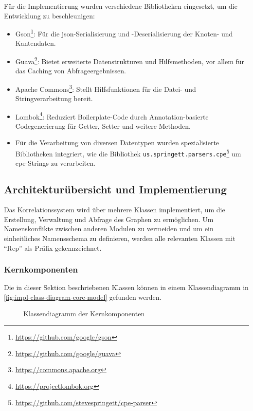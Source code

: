 Für die Implementierung wurden verschiedene Bibliotheken eingesetzt, um die Entwicklung zu beschleunigen:

\begin{itemize}
    \itemsep0em
    \item Gson\footnote{\url{https://github.com/google/gson}}: Für die \acrshort{json}-Serialisierung und -Deserialisierung der Knoten- und Kantendaten.
    \item Guava\footnote{\url{https://github.com/google/guava}}: Bietet erweiterte Datenstrukturen und Hilfsmethoden, vor allem für das Caching von Abfrageergebnissen.
    \item Apache Commons\footnote{\url{https://commons.apache.org}}: Stellt Hilfsfunktionen für die Datei- und Stringverarbeitung bereit.
    \item Lombok\footnote{\url{https://projectlombok.org}}: Reduziert Boilerplate-Code durch Annotation-basierte Codegenerierung für Getter, Setter und weitere Methoden.
    \item Für die Verarbeitung von diversen Datentypen wurden spezialisierte Bibliotheken integriert, wie die Bibliothek \texttt{us.springett.parsers.cpe}\footnote{\url{https://github.com/stevespringett/cpe-parser}} um \acrshort{cpe}-Strings zu verarbeiten.
\end{itemize}

\subsection{Architekturübersicht und Implementierung}\label{subsec:impl-arch-overview}

Das Korrelationssystem wird über mehrere Klassen implementiert, um die Erstellung, Verwaltung und Abfrage des Graphen zu ermöglichen.
Um Namenskonflikte zwischen anderen Modulen zu vermeiden und um ein einheitliches Namensschema zu definieren, werden alle relevanten Klassen mit \enquote{Rep} als Präfix gekennzeichnet.

\subsubsection{Kernkomponenten}

Die in dieser Sektion beschriebenen Klassen können in einem Klassendiagramm in \autoref{fig:impl-class-diagram-core-model} gefunden werden.

\begin{figure}[htbp]
    \centering
    \makebox[\textwidth]{}
    \caption{Klassendiagramm der Kernkomponenten}
    \label{fig:impl-class-diagram-core-model}
\end{figure}

